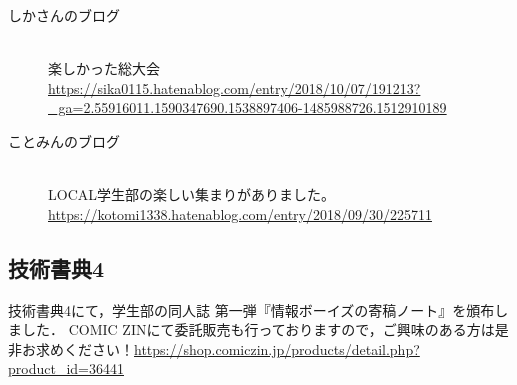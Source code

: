 \begin{description}
\item[しかさんのブログ]\mbox{}\\
楽しかった総大会\mbox{}\\
\url{https://sika0115.hatenablog.com/entry/2018/10/07/191213?_ga=2.55916011.1590347690.1538897406-1485988726.1512910189}
\end{description}

\begin{description}
\item[ことみんのブログ]\mbox{}\\
LOCAL学生部の楽しい集まりがありました。\mbox{}\\
\url{https://kotomi1338.hatenablog.com/entry/2018/09/30/225711}
\end{description}

\subsection{技術書典4}
技術書典4にて，学生部の同人誌 第一弾『情報ボーイズの寄稿ノート』を頒布しました．
COMIC ZINにて委託販売も行っておりますので，ご興味のある方は是非お求めください！\url{https://shop.comiczin.jp/products/detail.php?product_id=36441}\mbox{}\\

